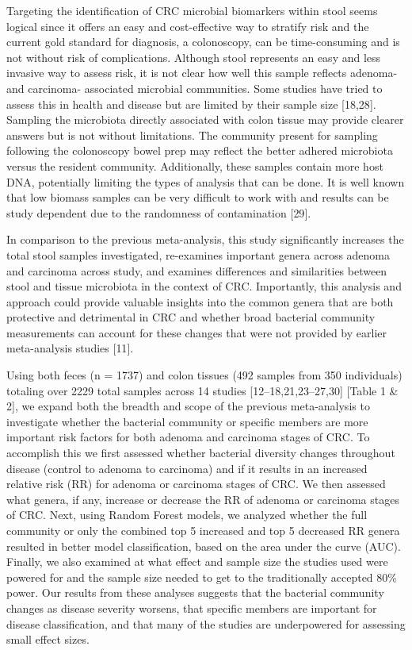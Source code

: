\documentclass[12pt,]{article}
\begin{document}
Targeting the identification of CRC microbial biomarkers within stool
seems logical since it offers an easy and cost-effective way to stratify
risk and the current gold standard for diagnosis, a colonoscopy, can be
time-consuming and is not without risk of complications. Although stool
represents an easy and less invasive way to assess risk, it is not clear
how well this sample reflects adenoma- and carcinoma- associated
microbial communities. Some studies have tried to assess this in health
and disease but are limited by their sample size {[}18,28{]}. Sampling
the microbiota directly associated with colon tissue may provide clearer
answers but is not without limitations. The community present for
sampling following the colonoscopy bowel prep may reflect the better
adhered microbiota versus the resident community. Additionally, these
samples contain more host DNA, potentially limiting the types of
analysis that can be done. It is well known that low biomass samples can
be very difficult to work with and results can be study dependent due to
the randomness of contamination {[}29{]}.

In comparison to the previous meta-analysis, this study significantly
increases the total stool samples investigated, re-examines important
genera across adenoma and carcinoma across study, and examines
differences and similarities between stool and tissue microbiota in the
context of CRC. Importantly, this analysis and approach could provide
valuable insights into the common genera that are both protective and
detrimental in CRC and whether broad bacterial community measurements
can account for these changes that were not provided by earlier
meta-analysis studies {[}11{]}.

Using both feces (n = 1737) and colon tissues (492 samples from 350
individuals) totaling over 2229 total samples across 14 studies
{[}12--18,21,23--27,30{]} {[}Table 1 \& 2{]}, we expand both the breadth
and scope of the previous meta-analysis to investigate whether the
bacterial community or specific members are more important risk factors
for both adenoma and carcinoma stages of CRC. To accomplish this we
first assessed whether bacterial diversity changes throughout disease
(control to adenoma to carcinoma) and if it results in an increased
relative risk (RR) for adenoma or carcinoma stages of CRC. We then
assessed what genera, if any, increase or decrease the RR of adenoma or
carcinoma stages of CRC. Next, using Random Forest models, we analyzed
whether the full community or only the combined top 5 increased and top
5 decreased RR genera resulted in better model classification, based on
the area under the curve (AUC). Finally, we also examined at what effect
and sample size the studies used were powered for and the sample size
needed to get to the traditionally accepted 80\% power. Our results from
these analyses suggests that the bacterial community changes as disease
severity worsens, that specific members are important for disease
classification, and that many of the studies are underpowered for
assessing small effect sizes.
\end{document}

